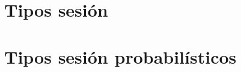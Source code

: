 \documentclass[11pt,a4paper]{tesis}
\begin{document}

\def\autor{Iván Pondal}
\def\tituloTesis{Inferencia de tipos sesión probabilísticos}
\def\runtitulo{Inferencia de tipos sesión probabilísticos}
\def\director{Hernán Melgratti}
\def\lugar{Buenos Aires, 2021}


\frontmatter
\pagestyle{empty}


\cleardoublepage

\cleardoublepage

\cleardoublepage
\tableofcontents

\mainmatter
\pagestyle{headings}


\chapter{Tipos sesión}





\chapter{Tipos sesión probabilísticos}



\backmatter


\end{document}
